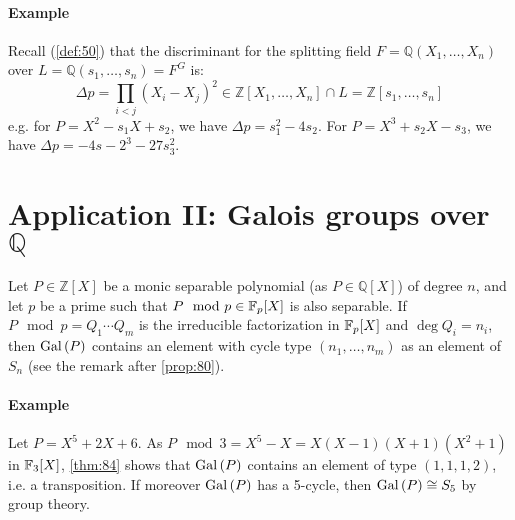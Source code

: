 
\paragraph{Example}

Recall (\autoref{def:50}) that the discriminant for the splitting field $F = \mathbb{Q}(X_1, \ldots, X_n)$ over $L = \mathbb{Q}(s_1, \ldots, s_n) = F^G$ is:
\[
\Delta{}p = \prod_{i<j}(X_i-X_j)^2 \in \mathbb{Z}[X_1, \ldots, X_n] \cap L = \mathbb{Z}[s_1, \ldots, s_n]
\]
e.g. for $P = X^2 -s_1X + s_2$, we have $\Delta{}p = s_1^2-4s_2$. For $P = X^3 +s_2X-s_3$, we have $\Delta{}p = -4s-2^3-27s_3^2$.

\section{Application II: Galois groups over $\mathbb{Q}$}

\begin{theorem}
\label{thm:84}
  Let $P \in \mathbb{Z}[X]$ be a monic separable polynomial (as $P \in \mathbb{Q}[X]$) of degree $n$, and let $p$ be a prime such that $P \mod p \in \mathbb{F}_{p}[X]$ is also separable. If $P \mod p = Q_1\cdots{}Q_m$ is the irreducible factorization in $\mathbb{F}_{p}[X]$ and $\deg Q_i = n_i$, then $\operatorname{Gal}\left(P\right)$ contains an element with cycle type $(n_1, \ldots, n_m)$ as an element of $S_n$ (see the remark after \autoref{prop:80}).
\end{theorem}

\paragraph{Example}

Let $P = X^5 + 2X + 6$. As $P \mod 3 = X^5-X =  X(X-1)(X+1)(X^2+1)$ in $\mathbb{F}_{3}[X]$, \autoref{thm:84} shows that $\operatorname{Gal}\left(P\right)$ contains an element of type $(1, 1, 1, 2)$, i.e. a transposition. If moreover $\operatorname{Gal}\left(P\right)$ has a 5-cycle, then $\operatorname{Gal}\left(P\right) \cong S_5$ by group theory.

